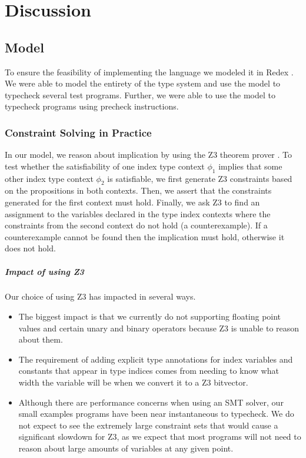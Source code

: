 \chapter{Discussion}
\label{chp:discussion}

\section{\name Model}
To ensure the feasibility of implementing the \name language we modeled it in Redex .
We were able to model the entirety of the type system and use the model to typecheck several test programs.
Further, we were able to use the model to typecheck programs using precheck instructions.

\subsection{Constraint Solving in Practice}
In our model, we reason about implication by using the Z3 theorem prover .
To test whether the satisfiability of one index type context $\phi_1$ implies that some other index type context $\phi_2$ is satisfiable, we first generate Z3 constraints based on the propositions in both contexts.
Then, we assert that the constraints generated for the first context must hold.
Finally, we ask Z3 to find an assignment to the variables declared in the type index contexts where the constraints from the second context do not hold (a counterexample).
If a counterexample cannot be found then the implication must hold, otherwise it does not hold.

\paragraph{Impact of using Z3}
Our choice of using Z3 has impacted \name in several ways.
\begin{itemize}
    \item The biggest impact is that we currently do not supporting floating point values and certain unary and binary operators because Z3 is unable to reason about them.
    \item The requirement of adding explicit type annotations for index variables and constants that appear in type indices comes from needing to know what width the variable will be when we convert it to a Z3 bitvector.
    \item Although there are performance concerns when using an SMT solver, our small examples programs have been near instantaneous to typecheck.
    We do not expect to see the extremely large constraint sets that would cause a significant slowdown for Z3, as we expect that most programs will not need to reason about large amounts of variables at any given point.
\end{itemize}

